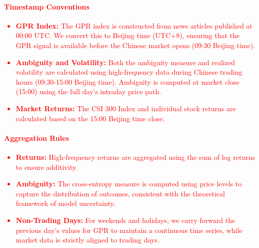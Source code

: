 \documentclass[preprint,12pt,authoryear]{elsarticle}
\begin{document}
\paragraph{\textcolor{red}{Timestamp Conventions}}
\textcolor{red}{\begin{itemize}
    \item \textbf{GPR Index:} The GPR index is constructed from news articles published at 00:00 UTC. We convert this to Beijing time (UTC+8), ensuring that the GPR signal is available before the Chinese market opens (09:30 Beijing time).
    \item \textbf{Ambiguity and Volatility:} Both the ambiguity measure and realized volatility are calculated using high-frequency data during Chinese trading hours (09:30-15:00 Beijing time). Ambiguity is computed at market close (15:00) using the full day's intraday price path.
    \item \textbf{Market Returns:} The CSI 300 Index and individual stock returns are calculated based on the 15:00 Beijing time close.
\end{itemize}}

\paragraph{\textcolor{red}{Aggregation Rules}}
\textcolor{red}{\begin{itemize}
    \item \textbf{Returns:} High-frequency returns are aggregated using the sum of log returns to ensure additivity.
    \item \textbf{Ambiguity:} The cross-entropy measure is computed using price levels to capture the distribution of outcomes, consistent with the theoretical framework of model uncertainty.
    \item \textbf{Non-Trading Days:} For weekends and holidays, we carry forward the previous day's values for GPR to maintain a continuous time series, while market data is strictly aligned to trading days.
\end{itemize}}
\end{document}
